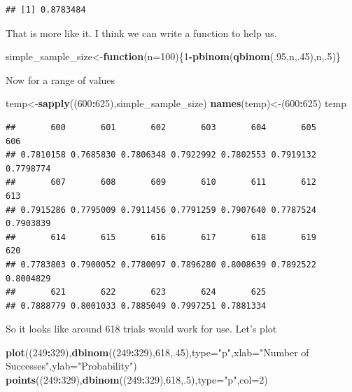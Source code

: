 \documentclass[]{book}
\newenvironment{Shaded}{\begin{snugshade}}{\end{snugshade}}
\newcommand{\KeywordTok}[1]{\textcolor[rgb]{0.13,0.29,0.53}{\textbf{#1}}}
\newcommand{\DataTypeTok}[1]{\textcolor[rgb]{0.13,0.29,0.53}{#1}}
\newcommand{\DecValTok}[1]{\textcolor[rgb]{0.00,0.00,0.81}{#1}}
\newcommand{\StringTok}[1]{\textcolor[rgb]{0.31,0.60,0.02}{#1}}
\newcommand{\ControlFlowTok}[1]{\textcolor[rgb]{0.13,0.29,0.53}{\textbf{#1}}}
\newcommand{\OperatorTok}[1]{\textcolor[rgb]{0.81,0.36,0.00}{\textbf{#1}}}
\newcommand{\NormalTok}[1]{#1}
\theoremstyle{definition}
\theoremstyle{definition}
\theoremstyle{definition}
\theoremstyle{remark}
\begin{document}
\begin{verbatim}
## [1] 0.8783484
\end{verbatim}

That is more like it. I think we can write a function to help us.

\begin{Shaded}
\begin{Highlighting}[]
\NormalTok{simple_sample_size<-}\ControlFlowTok{function}\NormalTok{(}\DataTypeTok{n=}\DecValTok{100}\NormalTok{)\{}\DecValTok{1}\OperatorTok{-}\KeywordTok{pbinom}\NormalTok{(}\KeywordTok{qbinom}\NormalTok{(.}\DecValTok{95}\NormalTok{,n,.}\DecValTok{45}\NormalTok{),n,.}\DecValTok{5}\NormalTok{)\}}
\end{Highlighting}
\end{Shaded}

Now for a range of values

\begin{Shaded}
\begin{Highlighting}[]
\NormalTok{temp<-}\KeywordTok{sapply}\NormalTok{((}\DecValTok{600}\OperatorTok{:}\DecValTok{625}\NormalTok{),simple_sample_size)}
\KeywordTok{names}\NormalTok{(temp)<-(}\DecValTok{600}\OperatorTok{:}\DecValTok{625}\NormalTok{)}
\NormalTok{temp    }
\end{Highlighting}
\end{Shaded}

\begin{verbatim}
##       600       601       602       603       604       605       606 
## 0.7810158 0.7685830 0.7806348 0.7922992 0.7802553 0.7919132 0.7798774 
##       607       608       609       610       611       612       613 
## 0.7915286 0.7795009 0.7911456 0.7791259 0.7907640 0.7787524 0.7903839 
##       614       615       616       617       618       619       620 
## 0.7783803 0.7900052 0.7780097 0.7896280 0.8008639 0.7892522 0.8004829 
##       621       622       623       624       625 
## 0.7888779 0.8001033 0.7885049 0.7997251 0.7881334
\end{verbatim}

So it looks like around 618 trials would work for use. Let's plot

\begin{Shaded}
\begin{Highlighting}[]
\KeywordTok{plot}\NormalTok{((}\DecValTok{249}\OperatorTok{:}\DecValTok{329}\NormalTok{),}\KeywordTok{dbinom}\NormalTok{((}\DecValTok{249}\OperatorTok{:}\DecValTok{329}\NormalTok{),}\DecValTok{618}\NormalTok{,.}\DecValTok{45}\NormalTok{),}\DataTypeTok{type=}\StringTok{"p"}\NormalTok{,}\DataTypeTok{xlab=}\StringTok{"Number of Successes"}\NormalTok{,}\DataTypeTok{ylab=}\StringTok{"Probability"}\NormalTok{)}
\KeywordTok{points}\NormalTok{((}\DecValTok{249}\OperatorTok{:}\DecValTok{329}\NormalTok{),}\KeywordTok{dbinom}\NormalTok{((}\DecValTok{249}\OperatorTok{:}\DecValTok{329}\NormalTok{),}\DecValTok{618}\NormalTok{,.}\DecValTok{5}\NormalTok{),}\DataTypeTok{type=}\StringTok{"p"}\NormalTok{,}\DataTypeTok{col=}\DecValTok{2}\NormalTok{)}
\end{Highlighting}
\end{Shaded}
\end{document}
